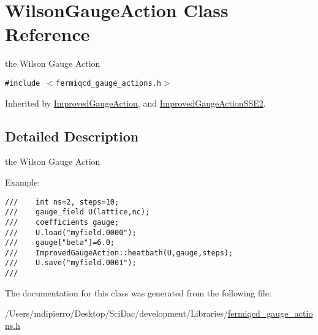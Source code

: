 \hypertarget{class_wilson_gauge_action}{
\section{WilsonGaugeAction Class Reference}
\label{class_wilson_gauge_action}
}
the Wilson Gauge Action  


{\tt \#include $<$fermiqcd\_\-gauge\_\-actions.h$>$}

Inherited by \hyperlink{class_improved_gauge_action}{ImprovedGaugeAction}, and \hyperlink{class_improved_gauge_action_s_s_e2}{ImprovedGaugeActionSSE2}.



\subsection{Detailed Description}
the Wilson Gauge Action 

Example: 

\footnotesize\begin{verbatim}
///    int ns=2, steps=10;
///    gauge_field U(lattice,nc);
///    coefficients gauge;
///    U.load("myfield.0000");
///    gauge["beta"]=6.0;
///    ImprovedGaugeAction::heatbath(U,gauge,steps);
///    U.save("myfield.0001");
/// \end{verbatim}
\normalsize
 

The documentation for this class was generated from the following file:\begin{CompactItemize}
\item 
/Users/mdipierro/Desktop/SciDac/development/Libraries/\hyperlink{fermiqcd__gauge__actions_8h}{fermiqcd\_\-gauge\_\-actions.h}\end{CompactItemize}
